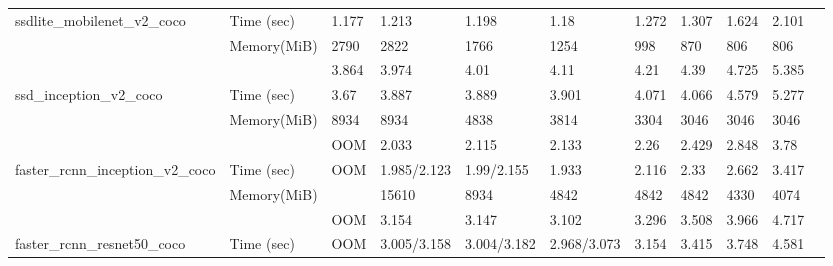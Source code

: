 \documentclass[conference]{IEEEtran}
\begin{document}
\begin{table}[]
{\begin{tabular}{lllllllllll}
ssdlite\_mobilenet\_v2\_coco                                    & Time (sec)    & 1.177               & 1.213              & 1.198             & 1.18              & 1.272            & 1.307  & 1.624             & 2.101       &          \\
                                                                & Memory(MiB)   & 2790                & 2822               & 1766              & 1254              & 998              & 870    & 806               & 806         &          \\
                                                                &               & 3.864               & 3.974              & 4.01              & 4.11              & 4.21             & 4.39   & 4.725             & 5.385       &          \\
ssd\_inception\_v2\_coco                                        & Time (sec)    & 3.67                & 3.887              & 3.889             & 3.901             & 4.071            & 4.066  & 4.579             & 5.277       &          \\
                                                                & Memory(MiB)   & 8934                & 8934               & 4838              & 3814              & 3304             & 3046   & 3046              & 3046        &          \\
                                                                &               & OOM                 & 2.033              & 2.115             & 2.133             & 2.26             & 2.429  & 2.848             & 3.78        &          \\
faster\_rcnn\_inception\_v2\_coco                               & Time (sec)    & OOM                 & 1.985/2.123        & 1.99/2.155        & 1.933             & 2.116            & 2.33   & 2.662             & 3.417       &          \\
                                                                & Memory(MiB)   &                     & 15610              & 8934              & 4842              & 4842             & 4842   & 4330              & 4074        &          \\
                                                                &               & OOM                 & 3.154              & 3.147             & 3.102             & 3.296            & 3.508  & 3.966             & 4.717       &          \\
faster\_rcnn\_resnet50\_coco                                    & Time (sec)    & OOM                 & 3.005/3.158        & 3.004/3.182       & 2.968/3.073       & 3.154            & 3.415  & 3.748             & 4.581       &          \\

\end{tabular}}
\end{table}
\end{document}
